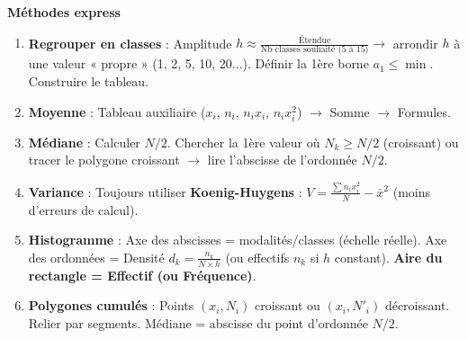 \documentclass[11pt]{article}
\newcommand{\cle}[1]{{\popxbold\color{popdark}#1}}
\begin{document}
\begin{bilan}
\textbf{Méthodes express}
\begin{enumerate}
    \item \textbf{Regrouper en classes} : Amplitude $h \approx \frac{\text{Étendue}}{\text{Nb classes souhaité (5 à 15)}} \to$ arrondir $h$ à une valeur « propre » (1, 2, 5, 10, 20...). Définir la 1ère borne $a_1 \le \min$. Construire le tableau.
    \item \textbf{Moyenne} : Tableau auxiliaire ($x_i$, $n_i$, $n_i x_i$, $n_i x_i^2$) $\to$ Somme $\to$ Formules.
    \item \textbf{Médiane} : Calculer $N/2$. Chercher la 1ère valeur où $N_k \ge N/2$ (croissant) ou tracer le polygone croissant $\to$ lire l'abscisse de l'ordonnée $N/2$.
    \item \textbf{Variance} : Toujours utiliser \textbf{Koenig-Huygens} : $V = \frac{\sum n_i x_i^2}{N} - \bar{x}^2$ (moins d'erreurs de calcul).
    \item \textbf{Histogramme} : Axe des abscisses = modalités/classes (échelle réelle). Axe des ordonnées = \cle{Densité} $d_k = \frac{n_k}{N \times h}$ (ou effectifs $n_k$ si $h$ constant). \textbf{Aire du rectangle = Effectif (ou Fréquence)}.
    \item \textbf{Polygones cumulés} : Points $(x_i, N_i)$ croissant ou $(x_i, N'_i)$ décroissant. Relier par segments. Médiane = abscisse du point d'ordonnée $N/2$.
\end{enumerate}

\end{bilan}
\end{document}
